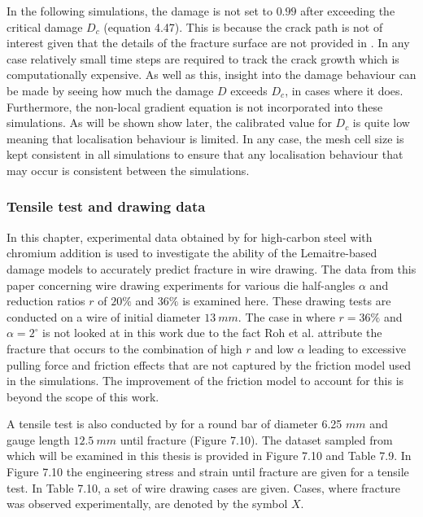 \documentclass[sn-mathphys,Numbered,draft]{sn-jnl}%
\begin{document}



In the following simulations, the damage is not set to $0.99$ after exceeding the critical damage $D_c$ (equation 4.47). This is because the crack path is not of interest given that the details of the fracture surface are not provided in \citet{roh_process_2021}. In any case relatively small time steps are required to track the crack growth which is computationally expensive. As well as this, insight into the damage behaviour can be made by seeing how much the damage $D$ exceeds $D_c$, in cases where it does. Furthermore, the non-local gradient equation is not incorporated into these simulations. As will be shown show later, the calibrated value for $D_c$ is quite low meaning that localisation behaviour is limited. In any case, the mesh cell size is kept consistent in all simulations to ensure that any localisation behaviour that may occur is consistent between the simulations. 

\subsubsection{Tensile test and drawing data}

In this chapter, experimental data obtained by \citet{roh_process_2021} for high-carbon steel with chromium addition is used to investigate the ability of the Lemaitre-based damage models to accurately predict fracture in wire drawing. The data from this paper concerning wire drawing experiments for various die half-angles $\alpha$ and reduction ratios $r$ of $20\%$ and $36\%$ is examined here. These drawing tests are conducted on a wire of initial diameter $13\ mm$. The case in \citet{roh_process_2021} where $r=36\%$ and $\alpha=2^{\circ}$ is not looked at in this work due to the fact Roh et al. attribute the fracture that occurs to the combination of high $r$ and low $\alpha$ leading to excessive pulling force and friction effects that are not captured by the friction model used in the simulations. The improvement of the friction model to account for this is beyond the scope of this work.  

A tensile test is also conducted by \citet{roh_process_2021} for a round bar of diameter 6.25 $mm$ and gauge length $12.5\ mm$ until fracture (Figure 7.10). The dataset sampled from \citet{roh_process_2021} which will be examined in this thesis is provided in Figure 7.10 and Table 7.9. In Figure 7.10 the engineering stress and strain until fracture are given for a tensile test. In Table 7.10, a set of wire drawing cases are given. Cases, where fracture was observed experimentally, are denoted by the symbol $X$.
\end{document}
